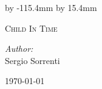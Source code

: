 \begin{titlepage}
\begin{center}
\thispagestyle{empty}	%

\par\vfill\break %

\advance\vsize by -115.4mm %
\advance\voffset by 15.4mm %

\textsc{\Huge Child In Time}\\[0.5cm]
\thispagestyle{empty}	%


\begin{minipage}{0.4\textwidth}
\begin{flushleft} \large
\emph{Author:}\\
Sergio Sorrenti\\
\end{flushleft}
\end{minipage}
\begin{minipage}{0.4\textwidth}
\begin{flushright} 

{\large \today}
\end{flushright}
\end{minipage}

\vspace*{\fill}%


\end{center}

\end{titlepage}
